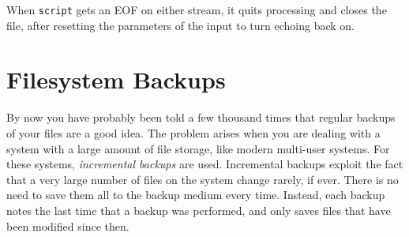 
When \texttt{script} gets an EOF on either stream, it quits processing
and closes the file, after resetting the parameters of the input to
turn echoing back on.


\section{Filesystem Backups}

By now you have probably been told a few thousand times that regular
backups of your files are a good idea. The problem
arises when you are dealing with a system with a large amount of file
storage, like modern multi-user systems. For these systems,
\textit{incremental backups} are used. Incremental backups exploit the
fact that a very large number of files on the system change rarely, if
ever. There is no need to save them all to the backup medium every
time. Instead, each backup notes the last time that a backup was
performed, and only saves files that have been modified since then.

